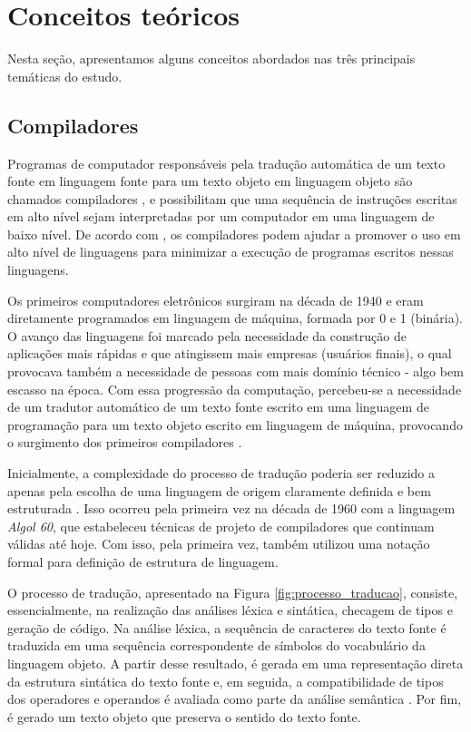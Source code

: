 \documentclass[12pt]{article}
\begin{document}
\section{Conceitos teóricos}

Nesta seção, apresentamos alguns conceitos abordados nas três principais temáticas do estudo.


\subsection{Compiladores} %

Programas de computador responsáveis pela tradução automática de um texto fonte em linguagem fonte para um texto objeto em linguagem objeto são chamados compiladores \cite{Niklaus}, e possibilitam que uma sequência de instruções escritas em alto nível sejam interpretadas por um computador em uma linguagem de baixo nível. De acordo com \cite{book_compilers}, os compiladores podem ajudar a promover o uso em alto nível de linguagens para minimizar a execução de programas escritos nessas linguagens. 

Os primeiros computadores eletrônicos surgiram na década de 1940 e eram diretamente programados em linguagem de máquina, formada por 0 e 1 (binária). O avanço das linguagens foi marcado pela necessidade da construção de aplicações mais rápidas e que atingissem mais empresas (usuários finais), o qual provocava também a necessidade de pessoas com mais domínio técnico - algo bem escasso na época. Com essa progressão da computação, percebeu-se a necessidade de um tradutor automático de um texto fonte escrito em uma linguagem de programação para um texto objeto escrito em linguagem de máquina, provocando o surgimento dos primeiros compiladores \cite{book_compilers}.

Inicialmente, a complexidade do processo de tradução poderia ser reduzido a apenas pela escolha de uma linguagem de origem claramente definida e bem estruturada \cite{Niklaus}. Isso ocorreu pela primeira vez na década de 1960 com a linguagem \textit{Algol 60}, que estabeleceu técnicas de projeto de compiladores que continuam válidas até hoje. Com isso, pela primeira vez, também utilizou uma notação formal para definição de estrutura de linguagem. 


O processo de tradução, apresentado na Figura \ref{fig:processo_traducao}, consiste, essencialmente, na realização das análises léxica e sintática, checagem de tipos e geração de código. Na análise léxica,  a sequência de caracteres do texto fonte é traduzida em uma sequência correspondente de símbolos do vocabulário da linguagem objeto. A partir desse resultado, é gerada em uma representação direta da estrutura sintática do texto fonte e, em seguida, a compatibilidade de tipos dos operadores e operandos é avaliada como parte da análise semântica \cite{Niklaus}. Por fim, é gerado um texto objeto que preserva o sentido do texto fonte.
\end{document}
